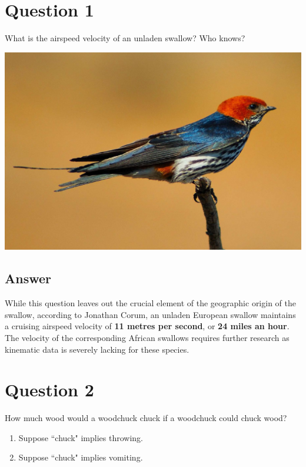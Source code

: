\documentclass[
	12pt, %
]{fphw}
\begin{document}
\section{Question 1}

\begin{problem}
	What is the airspeed velocity of an unladen swallow? Who knows?
\end{problem}
\begin{center}
	\includegraphics[width=0.5\columnwidth]{swallow.jpg} %
\end{center}


\subsection{Answer}

While this question leaves out the crucial element of the geographic origin of the swallow, according to Jonathan Corum, an unladen European swallow maintains a cruising airspeed velocity of \textbf{11 metres per second}, or \textbf{24 miles an hour}. The velocity of the corresponding African swallows requires further research as kinematic data is severely lacking for these species.


\section{Question 2}

\begin{problem}
	How much wood would a woodchuck chuck if a woodchuck could chuck wood?
	
	\medskip
	
	\begin{enumerate} %
		\item Suppose ``chuck" implies throwing.
		\item Suppose ``chuck" implies vomiting.
	\end{enumerate}
\end{problem}
\end{document}
